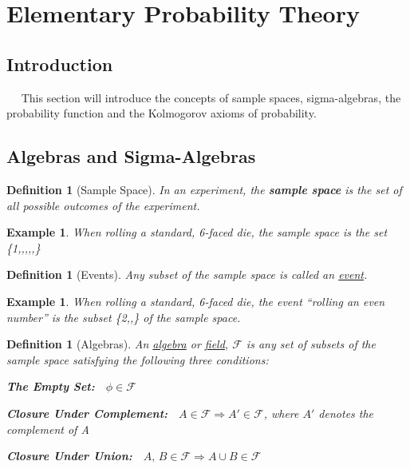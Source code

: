 \documentclass[12pt,a4paper]{article}
\newtheorem{defn}[thm]{Definition}
\newtheorem{ex}[thm]{Example}
\begin{document}
\clearpage
\section{Elementary Probability Theory}

\subsection{Introduction}

$\quad$ This section will introduce the concepts of sample spaces, sigma-algebras, the probability function and the Kolmogorov axioms of probability.
\vspace{12pt}


\subsection{Algebras and Sigma-Algebras}

\begin{defn}[Sample Space]

In an experiment, the \textbf{sample space} is the set of all possible outcomes of the experiment.\end{defn}

\begin{ex}

When rolling a standard, 6-faced die, the sample space is the set \{1,,,,,\}\end{ex}

\begin{defn}[Events]

Any subset of the sample space is called an \underline{event}.\end{defn}

\begin{ex}

When rolling a standard, 6-faced die, the event ``rolling an even number'' is the subset \{2,,\} of the sample space.\end{ex}

\begin{defn}[Algebras]

An \underline{algebra} or \underline{field}, $\mathcal{F}$ is any set of subsets of the sample space satisfying the following three conditions:\par
\vspace{10pt}
\textbf{The Empty Set:}$\quad\phi\in\mathcal{F}$\par
\vspace{10pt}
\textbf{Closure Under Complement:}$\quad A\in\mathcal{F}\Rightarrow A'\in\mathcal{F}$, where $A'$ denotes the complement of A\par
\vspace{10pt}
\textbf{Closure Under Union:}$\quad A,\,B\in\mathcal{F}\Rightarrow A\cup B\in\mathcal{F}$\par
\vspace{12pt}
\end{defn}
\end{document}
